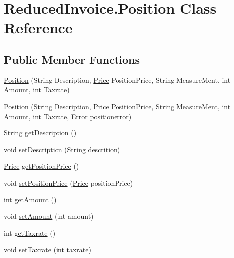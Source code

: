 \hypertarget{class_reduced_invoice_1_1_position}{}\section{Reduced\+Invoice.\+Position Class Reference}
\label{class_reduced_invoice_1_1_position}
\subsection*{Public Member Functions}
\begin{DoxyCompactItemize}
\item 
\hyperlink{class_reduced_invoice_1_1_position_a2668f00d53cf5704f047f300f77a42ad}{Position} (String Description, \hyperlink{class_reduced_invoice_1_1_price}{Price} Position\+Price, String Measure\+Ment, int Amount, int Taxrate)
\item 
\hyperlink{class_reduced_invoice_1_1_position_addc0dce10bd22dce5f94226b283bcf4d}{Position} (String Description, \hyperlink{class_reduced_invoice_1_1_price}{Price} Position\+Price, String Measure\+Ment, int Amount, int Taxrate, \hyperlink{enum_reduced_invoice_1_1_a_invoice_1_1_error}{Error} positionerror)
\item 
String \hyperlink{class_reduced_invoice_1_1_position_ab4c6da1a734c40337974e76ea4491dbf}{get\+Description} ()
\item 
void \hyperlink{class_reduced_invoice_1_1_position_a86b0bb99ef806d0e8298e8b5030f8964}{set\+Description} (String descrition)
\item 
\hyperlink{class_reduced_invoice_1_1_price}{Price} \hyperlink{class_reduced_invoice_1_1_position_ace39a33b2c836d4689b4eae38f6c3ca3}{get\+Position\+Price} ()
\item 
void \hyperlink{class_reduced_invoice_1_1_position_aeac9fdead656ad61a41dbca42a4d8fdd}{set\+Position\+Price} (\hyperlink{class_reduced_invoice_1_1_price}{Price} position\+Price)
\item 
int \hyperlink{class_reduced_invoice_1_1_position_a5f2aa6f49886d3186e53e76a55dfdf91}{get\+Amount} ()
\item 
void \hyperlink{class_reduced_invoice_1_1_position_afd4c38ea287c5e39f5537673f4efc1ce}{set\+Amount} (int amount)
\item 
int \hyperlink{class_reduced_invoice_1_1_position_ae6fa813dd7b205c91b5d340e467751da}{get\+Taxrate} ()
\item 
void \hyperlink{class_reduced_invoice_1_1_position_a44eab6fd92814298a7e34ff1ffd13422}{set\+Taxrate} (int taxrate)
\end{DoxyCompactItemize}


